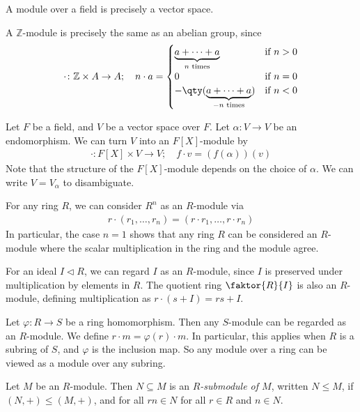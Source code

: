 \begin{example}
	A module over a field is precisely a vector space.

	A $\mathbb Z$-module is precisely the same as an abelian group, since
	\begin{align*}
		\cdot \colon \mathbb Z \times A \to A;\quad n \cdot a = \begin{cases}
			\underbrace{a + \dots + a}_{n \text{ times}}         & \text{if } n > 0 \\
			0                                                    & \text{if } n = 0 \\
			-\qty(\underbrace{a + \dots + a}_{-n \text{ times}}) & \text{if } n < 0
		\end{cases}
	\end{align*}

	Let $F$ be a field, and $V$ be a vector space over $F$.
	Let $\alpha \colon V \to V$ be an endomorphism.
	We can turn $V$ into an $F[X]$-module by
	\begin{align*}
		\cdot \colon F[X] \times V \to V;\quad f \cdot v = (f(\alpha))(v)
	\end{align*}
	Note that the structure of the $F[X]$-module depends on the choice of $\alpha$.
	We can write $V = V_\alpha$ to disambiguate.

	For any ring $R$, we can consider $R^n$ as an $R$-module via
	\begin{align*}
		r \cdot (r_1, \dots, r_n) = (r \cdot r_1, \dots, r \cdot r_n)
	\end{align*}
	In particular, the case $n = 1$ shows that any ring $R$ can be considered an $R$-module where the scalar multiplication in the ring and the module agree.

	For an ideal $I \triangleleft R$, we can regard $I$ as an $R$-module, since $I$ is preserved under multiplication by elements in $R$.
	The quotient ring $\faktor{R}{I}$ is also an $R$-module, defining multiplication as $r \cdot (s+I) = rs + I$.

	Let $\varphi \colon R \to S$ be a ring homomorphism.
	Then any $S$-module can be regarded as an $R$-module.
	We define $r \cdot m = \varphi(r) \cdot m$.
	In particular, this applies when $R$ is a subring of $S$, and $\varphi$ is the inclusion map.
	So any module over a ring can be viewed as a module over any subring.
\end{example}
\begin{definition}
	Let $M$ be an $R$-module.
	Then $N \subseteq M$ is an \textit{$R$-submodule of $M$}, written $N \leq M$, if $(N, +) \leq (M, +)$, and for all $rn \in N$ for all $r \in R$ and $n \in N$.
\end{definition}
